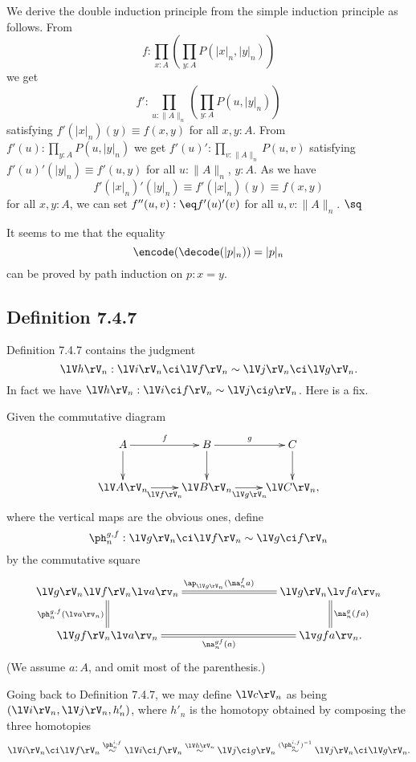 \documentclass[12pt]{article}
\begin{document}
We derive the double induction principle from the simple induction principle as follows. From 
$$
f:\prod_{x:A}\left(\prod_{y:A}P(\lvert x\rvert_n,\lvert y\rvert_n)\right)
$$ 
we get 
$$
f':\prod_{u:\lVert A\rVert_n}\left(\prod_{y:A}P(u,\lvert y\rvert_n)\right)
$$ 
satisfying $f'(\lvert x\rvert_n)(y)\equiv f(x,y)$ for all $x,y:A$. From $f'(u):\prod_{y:A}P(u,\lvert y\rvert_n)$ we get $f'(u)':\prod_{v:\lVert A\rVert_n}P(u,v)$ satisfying $f'(u)'(\lvert y\rvert_n)\equiv f'(u,y)$ for all $u:\lVert A\rVert_n$, $y:A$. As we have 
$$
f'(\lvert x\rvert_n)'(\lvert y\rvert_n)\equiv f'(\lvert x\rvert_n)(y)\equiv f(x,y) 
$$ 
for all $x,y:A$, we can set $f''(u,v):\eq f'(u)'(v)$ for all $u,v:\lVert A\rVert_n$. $\sq$

It seems to me that the equality 
$$
\encode(\decode(\lvert p\rvert_n))=\lvert p\rvert_n
$$ 
can be proved by path induction on $p:x=y$.


\subsection{Definition 7.4.7}\label{747}

Definition 7.4.7 contains the judgment 
$$
\lV h\rV_n:\lV i\rV_n\ci\lV f\rV_n\sim\lV j\rV_n\ci\lV g\rV_n.
$$ 
In fact we have $\lV h\rV_n:\lV i\ci f\rV_n\sim\lV j\ci g\rV_n$. Here is a fix. 

Given the commutative diagram
$$
\xymatrix{
A\ar[r]^f\ar[d]&B\ar[r]^g\ar[d]&C\ar[d]\\
\lV A\rV_n\ar[r]_{\lV f\rV_n}&\lV B\rV_n\ar[r]_{\lV g\rV_n}&\lV C\rV_n,}
$$ 
where the vertical maps are the obvious ones, define 
$$
\ph_n^{g,f}:\lV g\rV_n\ci\lV f\rV_n\sim\lV g\ci f\rV_n
$$ 
by the commutative square 
$$
\xymatrix{
\lV g\rV_n\lV f\rV_n\lv a\rv_n\ar@{=}[d]_{\ph_n^{g,f}(\lv a\rv_n)}\ar@{=}[rrr]^{\ap_{\lV g\rV_n}(\na_n^fa)}&&&
\lV g\rV_n\lv fa\rv_n\ar@{=}[d]^{\na_n^g(fa)}\\
\lV gf\rV_n\lv a\rv_n\ar@{=}[rrr]_{\na_n^{gf}(a)}&&&\lv gfa\rv_n.}
$$ 
(We assume $a:A$, and omit most of the parenthesis.)

Going back to Definition 7.4.7, we may define $\lV c\rV_n$ as being $(\lV i\rV_n,\lV j\rV_n,h'_n)$, where $h'_n$ is the homotopy obtained by composing the three homotopies
$$
\lV i\rV_n\ci\lV f\rV_n\overset{\ph_n^{i,f}}{\sim}\lV i\ci f\rV_n\overset{\lV h\rV_n}{\sim}\lV j\ci g\rV_n\overset{(\ph_n^{i,f})^{-1}}{\sim}\lV j\rV_n\ci\lV g\rV_n.
$$

\end{document}
